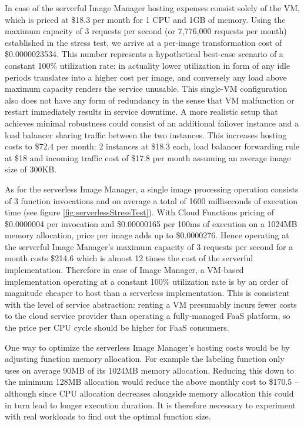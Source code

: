 In case of the serverful Image Manager hosting expenses consist solely of the VM, which is priced at \$18.3 per month for 1 CPU and 1GB of memory. Using the maximum capacity of 3 requests per second (or 7,776,000 requests per month) established in the stress test, we arrive at a per-image transformation cost of \$0.0000023534.
This number represents a hypothetical best-case scenario of a constant 100\% utilization rate: in actuality lower utilization in form of any idle periods translates into a higher cost per image, and conversely any load above maximum capacity renders the service unusable. This single-VM configuration also does not have any form of redundancy in the sense that VM malfunction or restart immediately results in service downtime. A more realistic setup that achieves minimal robustness could consist of an additional failover instance and a load balancer sharing traffic between the two instances. This increases hosting costs to \$72.4 per month: 2 instances at \$18.3 each, load balancer forwarding rule at \$18 and incoming traffic cost of \$17.8 per month assuming an average image size of 300KB. \parencite{google18cloudFunctions}

As for the serverless Image Manager, a single image processing operation consists of 3 function invocations and on average a total of 1600 milliseconds of execution time (see figure \ref{fig:serverlessStressTest}). With Cloud Functions pricing of \$0.0000004 per invocation and \$0.00000165 per 100ms of execution on a 1024MB memory allocation, price per image adds up to \$0.0000276. Hence operating at the serverful Image Manager's maximum capacity of 3 requests per second for a month costs \$214.6 which is almost 12 times the cost of the serverful implementation. Therefore in case of Image Manager, a VM-based implementation operating at a constant 100\% utilization rate is by an order of magnitude cheaper to host than a serverless implementation. This is consistent with the level of service abstraction: renting a VM presumably incurs fewer costs to the cloud service provider than operating a fully-managed FaaS platform, so the price per CPU cycle should be higher for FaaS consumers. \parencite{google18cloudFunctions}

One way to optimize the serverless Image Manager's hosting costs would be by adjusting function memory allocation. For example the labeling function only uses on average 90MB of its 1024MB memory allocation. Reducing this down to the minimum 128MB allocation would reduce the above monthly cost to \$170.5 -- although since CPU allocation decreases alongside memory allocation this could in turn lead to longer execution duration. It is therefore necessary to experiment with real workloads to find out the optimal function size.

